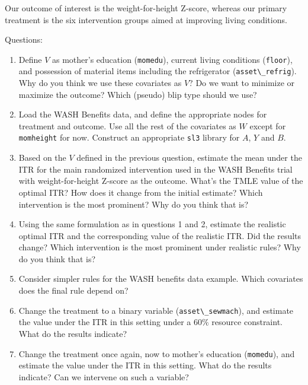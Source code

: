 \documentclass[
  12pt, krantz2,
]{krantz}
\newcommand{\passthrough}[1]{#1}
\newcommand{\1}{\mathbbm{1}}
\theoremstyle{definition}
\theoremstyle{definition}
\theoremstyle{definition}
\theoremstyle{definition}
\theoremstyle{remark}
\begin{document}
Our outcome of interest is the weight-for-height Z-score, whereas our primary
treatment is the six intervention groups aimed at improving living conditions.

Questions:

\begin{enumerate}
\def\labelenumi{\arabic{enumi}.}
\item
  Define \(V\) as mother's education (\passthrough{\lstinline!momedu!}), current living conditions (\passthrough{\lstinline!floor!}),
  and possession of material items including the refrigerator (\passthrough{\lstinline!asset\_refrig!}).
  Why do you think we use these covariates as \(V\)? Do we want to minimize or
  maximize the outcome? Which (pseudo) blip type should we use?
\item
  Load the WASH Benefits data, and define the appropriate nodes for treatment
  and outcome. Use all the rest of the covariates as \(W\) except for
  \passthrough{\lstinline!momheight!} for now. Construct an appropriate \passthrough{\lstinline!sl3!} library for \(A\), \(Y\) and
  \(B\).
\item
  Based on the \(V\) defined in the previous question, estimate the mean under
  the ITR for the main randomized intervention used in the WASH Benefits trial
  with weight-for-height Z-score as the outcome. What's the TMLE value of the
  optimal ITR? How does it change from the initial estimate? Which
  intervention is the most prominent? Why do you think that is?
\item
  Using the same formulation as in questions 1 and 2, estimate the realistic
  optimal ITR and the corresponding value of the realistic ITR. Did the results
  change? Which intervention is the most prominent under realistic rules? Why do
  you think that is?
\item
  Consider simpler rules for the WASH benefits data example. Which covariates does the
  final rule depend on?
\item
  Change the treatment to a binary variable (\passthrough{\lstinline!asset\_sewmach!}), and estimate the
  value under the ITR in this setting under a \(60\%\) resource constraint. What
  do the results indicate?
\item
  Change the treatment once again, now to mother's education (\passthrough{\lstinline!momedu!}), and
  estimate the value under the ITR in this setting. What do the results
  indicate? Can we intervene on such a variable?
\end{enumerate}
\end{document}

